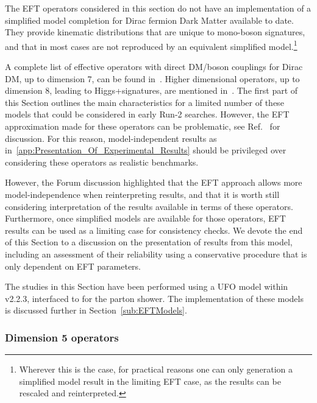 The EFT operators considered in this section do not have an implementation 
of a simplified model completion for Dirac fermion Dark Matter available to date. 
They provide kinematic distributions that 
are unique to mono-boson signatures, and that in most cases 
are not reproduced by an equivalent simplified model.\footnote{Wherever this is
the case, for practical reasons one can only generation a simplified model result 
in the limiting EFT case, as the results can be rescaled and reinterpreted.}

A complete list of effective operators with direct DM/boson couplings for
Dirac DM, up to dimension 7, can be found in~\cite{Cotta:2012nj, Carpenter:2012rg, Crivellin:2015wva}. 
Higher dimensional operators, up to dimension 8, leading to Higgs+\MET signatures,
are mentioned in~\cite{Carpenter:2012rg, Berlin:2014cfa}. The first part of this Section outlines
the main characteristics for a limited number of these models that could be 
considered in early Run-2 searches. 
However, the EFT approximation made for these operators can be problematic, see Ref.~\cite{Berlin:2014cfa} for discussion.
For this reason, model-independent results as in~\ref{app:Presentation_Of_Experimental_Results} 
should be privileged over considering these operators as realistic benchmarks. 

However, the Forum discussion highlighted that the EFT approach allows
more model-independence when reinterpreting results, and that it is worth still considering
interpretation of the results available in terms of these operators. Furthermore, once simplified models are available
for those operators, EFT results can be used as a limiting case for consistency checks. 
We devote the end of this Section to a discussion on the presentation of results 
from this model, including an assessment of their reliability 
using a conservative procedure that is only dependent on EFT parameters.

The studies in this Section
have been performed using a UFO model within \madgraph v2.2.3, interfaced to  for the parton shower.  
The implementation of these models is discussed further in Section~\ref{sub:EFTModels}.

\subsubsection{Dimension 5 operators}
\label{sub:EW_EFT_Dim5}

